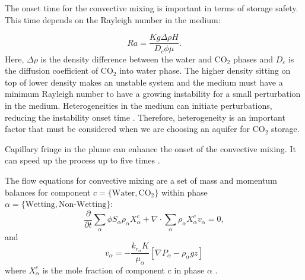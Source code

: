 The onset time for the convective mixing is important in terms of storage
safety. This time depends on the Rayleigh number in the medium:

\begin{equation}
 Ra = \frac{Kg\Delta \rho H}{D_c \phi \mu}.
 \label{Ra}
\end{equation} Here, $\Delta \rho$ is the density difference between the water and
$\mbox{CO}_2$ phases and $D_c$ is the diffusion coefficient of $\mbox{CO}_2$
into water phase. The higher density sitting on top of lower density makes an
unstable system and the medium must have a minimum Rayleigh number to
have a growing instability for a small perturbation in the medium.
Heterogeneities in the medium can initiate perturbations, reducing the
instability onset time \cite{hassanzadeh2005modelling,elenius2012time}.
Therefore, heterogeneity is an important factor that must be considered when we
are choosing an aquifer for $\mbox{CO}_2$ storage.

Capillary fringe in the plume can enhance the onset of the convective mixing. It can
speed up the process up to five times \cite{eleniuseffects}.

The flow equations for convective mixing are a set of mass and momentum balances for component $c=\{\mbox{Water},\mbox{CO}_2\}$ within phase
$\alpha=\{\mbox{Wetting},\mbox{Non-Wetting}\}$:
\begin{equation}
\frac{\partial}{\partial t} \underset{\alpha}{\sum}\phi S_\alpha \rho_\alpha
X_{\alpha}^c + \nabla \cdot \underset{\alpha}{\sum} \rho_\alpha X_{\alpha}^c
v_\alpha = 0,   
 \label{eq:massCo2}
\end{equation} and 
\begin{equation}
 v_\alpha = -\frac{k_{r_\alpha}K}{\mu_\alpha} \left[  \nabla
P_\alpha-\rho_\alpha g z \right]
 \label{eq:darcyCo2}
\end{equation} where $X_{\alpha}^c$ is the mole fraction of
component $\mbox{c}$ in phase $\alpha$ \cite{elenius2010co2}. 

